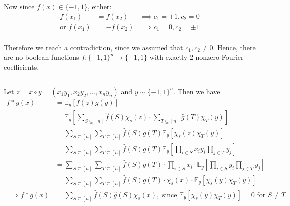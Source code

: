 \documentclass{article}
\begin{document}
Now since $f(x) \in \{-1, 1\}$, either:
\begin{align*}
	f(x_1) &= f(x_2) &\implies c_1 = \pm 1, c_2 = 0 \\
	\text{or } f(x_1) &= -f(x_2) &\implies c_1 = 0, c_2 = \pm 1 \\
\end{align*}

Therefore we reach a contradiction, since we assumed that $c_1, c_2 \neq 0$. Hence, there are no boolean functions $f : {\{-1, 1\}}^n \rightarrow \{-1, 1\}$ with exactly 2 nonzero Fourier coefficients. \begin{flushright}\qedsymbol\end{flushright}


\subsection{}
\vspace*{-8mm}

Let $z = x \circ y = (x_1 y_1, x_2 y_2, \ldots, x_n y_n)$ and $y \sim {\{-1, 1\}}^n$. Then we have
\begin{align*}
	f * g(x) &= \mathbb{E}_{y}[f(z)g(y)] \\
	&= \mathbb{E}_{y} \left[\sum_{S \subseteq [n]} \widehat{f}(S) \chi_s(z) \cdot \sum_{T \subseteq [n]} \widehat{g}(T) \chi_T(y) \right] \\
	&= \sum_{S \subseteq [n]} \sum_{T \subseteq [n]} \widehat{f}(S) \widehat{g}(T) \mathbb{E}_{y} \left[\chi_s(z) \chi_T(y) \right] \\
	&= \sum_{S \subseteq [n]} \sum_{T \subseteq [n]} \widehat{f}(S) \widehat{g}(T) \mathbb{E}_{y} \left[\prod_{i \in S} x_i y_i \prod_{j \in T} y_j \right] \\
	&= \sum_{S \subseteq [n]} \sum_{T \subseteq [n]} \widehat{f}(S) \widehat{g}(T) 
	\cdot \prod_{i \in S} x_i \cdot \mathbb{E}_{y} \left[\prod_{i \in S} y_i 
	\prod_{j \in T} y_j\right] \\
	&= \sum_{S \subseteq [n]} \sum_{T \subseteq [n]} \widehat{f}(S) \widehat{g}(T)
	\cdot \chi_s(x) \cdot \mathbb{E}_{y} \left[\chi_s(y)
	\chi_T(y)\right] \\
\implies f * g(x) &= \boxed{\sum_{S \subseteq [n]} \widehat{f}(S) \widehat{g}(S) \chi_s(x),} \text{ since } \mathbb{E}_{y} \left[\chi_s(y) \chi_T(y)\right] = 0 \text{ for } S \neq T \\
\end{align*}
\end{document}
